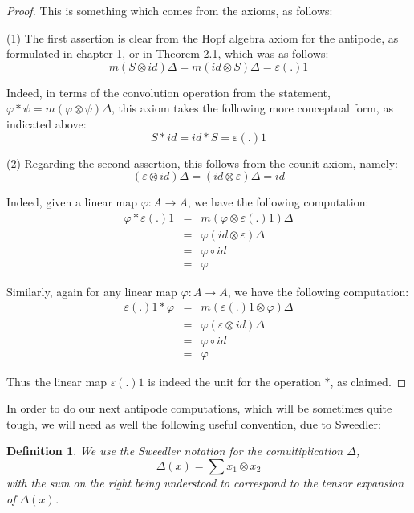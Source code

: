 \documentclass[12pt]{amsbook}
\newtheorem{definition}[theorem]{Definition}
\begin{document}
\begin{proof}
This is something which comes from the axioms, as follows:

\medskip

(1) The first assertion is clear from the Hopf algebra axiom for the antipode, as formulated in chapter 1, or in Theorem 2.1, which was as follows:
$$m(S\otimes id)\Delta=m(id\otimes S)\Delta=\varepsilon(.)1$$

Indeed, in terms of the convolution operation from the statement, $\varphi*\psi=m(\varphi\otimes\psi)\Delta$, this axiom takes the following more conceptual form, as indicated above:
$$S*id=id*S=\varepsilon(.)1$$

(2) Regarding the second assertion, this follows from the counit axiom, namely:
$$(\varepsilon\otimes id)\Delta=(id\otimes\varepsilon)\Delta=id$$

Indeed, given a linear map $\varphi:A\to A$, we have the following computation:
\begin{eqnarray*}
\varphi*\varepsilon(.)1
&=&m(\varphi\otimes\varepsilon(.)1)\Delta\\
&=&\varphi(id\otimes\varepsilon)\Delta\\
&=&\varphi\circ id\\
&=&\varphi
\end{eqnarray*}

Similarly, again for any linear map $\varphi:A\to A$, we have the following computation:
\begin{eqnarray*}
\varepsilon(.)1*\varphi
&=&m(\varepsilon(.)1\otimes\varphi)\Delta\\
&=&\varphi(\varepsilon\otimes id)\Delta\\
&=&\varphi\circ id\\
&=&\varphi
\end{eqnarray*}

Thus the linear map $\varepsilon(.)1$ is indeed the unit for the operation $*$, as claimed.
\end{proof}

In order to do our next antipode computations, which will be sometimes quite tough, we will need as well the following useful convention, due to Sweedler:


\begin{definition}
We use the Sweedler notation for the comultiplication $\Delta$,
$$\Delta(x)=\sum x_1\otimes x_2$$
with the sum on the right being understood to correspond to the tensor expansion of $\Delta(x)$.
\end{definition}
\end{document}
